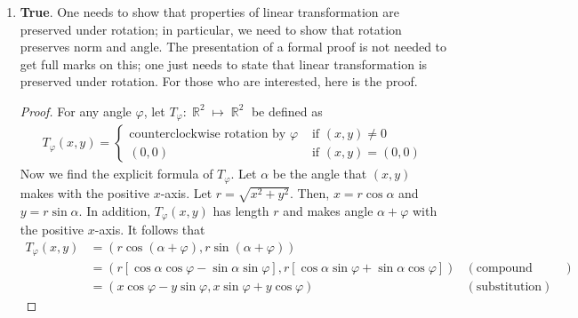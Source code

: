 \documentclass{amsart}
\theoremstyle{definition}
\theoremstyle{definition}
\DeclareMathOperator{\R}{\mathbb{R}}
\DeclareMathOperator{\1}{\mathbbm{1}}
\renewcommand{\phi}{\varphi}
\begin{document}
\begin{enumerate}[itemsep = 2mm]
\begin{enumerate}
		
		\item \textbf{True}. One needs to show that properties of linear transformation are preserved under rotation; in particular, we need to show that rotation preserves norm and angle. The presentation of a formal proof is not needed to get full marks on this; one just needs to state that linear transformation is preserved under rotation. For those who are interested, here is the proof.
		
		
		\bigskip
		
		\begin{proof}
			For any angle $\phi$, let $T_{\phi} : \R^2 \mapsto \R^2$ be defined as
			\begin{align*}
			T_\phi (x,y) = \begin{cases}
				\text{counterclockwise rotation by } \phi & \text{ if } (x,y) \neq 0 \\
				(0,0) & \text{ if } (x,y) = (0,0)
			\end{cases}
			\end{align*}
			Now we find the explicit formula of $T_\phi$. Let $\alpha$ be the angle that $(x,y)$ makes with the positive $x$-axis. Let $r = \sqrt{x^2 + y^2}$. Then, $x = r \cos \alpha$ and $y = r \sin \alpha$. In addition, $T_\phi (x,y) $ has length $r$ and makes angle $\alpha + \phi$ with the positive $x$-axis. It follows that
			\begin{align*}
			T_\phi (x,y) &= (r\cos(\alpha + \phi), r\sin(\alpha + \phi)) & \\
			&= (r[\cos \alpha \cos \phi - \sin \alpha \sin \phi], r[\cos \alpha \sin \phi + \sin \alpha \cos \phi]) & (\text{compound angle formulae}) \\
			&= (x \cos \phi - y \sin \phi, x \sin \phi + y \cos \phi) & (\text{substitution})
			\end{align*}
			

\end{proof}
\end{enumerate}
\end{enumerate}
\end{document}
